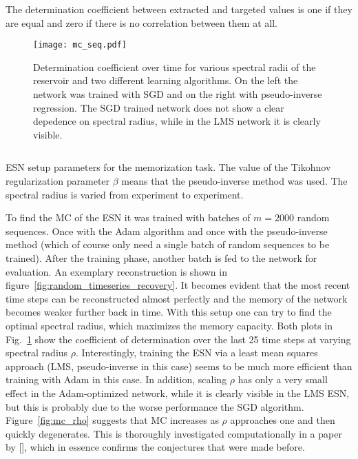 The determination coefficient between extracted and targeted values is one if
they are equal and zero if there is no correlation between them at all.
\begin{figure}
  \texttt{[image: mc\_seq.pdf]}
  \caption{Determination coefficient over time for various spectral radii of
  the reservoir and two different learning algorithms. On the left the network
  was trained with SGD and on the right with pseudo-inverse regression. The SGD
  trained network does not show a clear depedence on spectral radius, while in
  the LMS network it is clearly visible.}
  \label{fig:mc_seq}
\end{figure}

\begin{listing}
  \inputminted{json}{pseudocode/model_setups/memorize_setup.json}
  \label{lst:memorize_setup}
  \caption{ESN setup parameters for the memorization task. The 
    value of the Tikohnov regularization parameter $\beta$ means that the
    pseudo-inverse method was used. The spectral radius is varied from experiment
    to experiment.
  }
\end{listing}

To find the MC of the ESN it was trained with batches of $m=2000$ random
sequences.  Once with the Adam algorithm and once with the pseudo-inverse
method (which of course only need a single batch of random sequences to be
trained). After the training phase, another batch is fed to the network for
evaluation. An exemplary reconstruction is shown in
figure~\ref{fig:random_timeseries_recovery}.  It becomes evident that the most
recent time steps can be reconstructed almost perfectly and the memory of the
network becomes weaker further back in time.  With this setup one can try to
find the optimal spectral radius, which maximizes the memory capacity.  Both
plots in Fig.~\ref{fig:mc_seq} show the coefficient of determination over the
last 25 time steps at varying spectral radius $\rho$.  Interestingly, training
the ESN via a least mean squares approach (LMS, pseudo-inverse in this case)
seems to be much more efficient than training with Adam in this case.  In
addition, scaling $\rho$ has only a very small effect in the Adam-optimized
network, while it is clearly visible in the LMS ESN, but this is probably due
to the worse performance the SGD algorithm.  Figure~\ref{fig:mc_rho} suggests
that MC increases as $\rho$ approaches one and then quickly degenerates. This
is thoroughly investigated computationally in a paper by [\cite{farkavs2016}],
which in essence confirms the conjectures that were made before.

